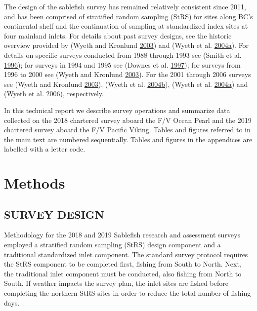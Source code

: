 \documentclass[12pt]{article}\usepackage[]{graphicx}\usepackage[]{color}
\begin{document}
The design of the sablefish survey has remained relatively consistent since 2011, and has been comprised of stratified random sampling (StRS) for sites along BC's continental shelf and the continuation of sampling at standardized index sites at four mainland inlets. For details about past survey designs, see the historic overview provided by (Wyeth and Kronlund \protect\hyperlink{ref-Wyeth2003}{2003}) and (Wyeth et al. \protect\hyperlink{ref-Wyeth2004b}{2004}\protect\hyperlink{ref-Wyeth2004b}{a}). For details on specific surveys conducted from 1988 through 1993 see (Smith et al. \protect\hyperlink{ref-Smith1996}{1996}); for surveys in 1994 and 1995 see (Downes et al. \protect\hyperlink{ref-Downes1997}{1997}); for surveys from 1996 to 2000 see (Wyeth and Kronlund \protect\hyperlink{ref-Wyeth2003}{2003}). For the 2001 through 2006 surveys see (Wyeth and Kronlund \protect\hyperlink{ref-Wyeth2003}{2003}), (Wyeth et al. \protect\hyperlink{ref-Wyeth2004a}{2004}\protect\hyperlink{ref-Wyeth2004a}{b}), (Wyeth et al. \protect\hyperlink{ref-Wyeth2004b}{2004}\protect\hyperlink{ref-Wyeth2004b}{a}) and (Wyeth et al. \protect\hyperlink{ref-Wyeth2006}{2006}), respectively.

In this technical report we describe survey operations and summarize data collected on the 2018 chartered survey aboard the F/V Ocean Pearl and the 2019 chartered survey aboard the F/V Pacific Viking. Tables and figures referred to in the main text are numbered sequentially. Tables and figures in the appendices are labelled with a letter code.

\hypertarget{methods}{%
\section{Methods}\label{methods}}

\hypertarget{survey-design}{%
\subsection{SURVEY DESIGN}\label{survey-design}}

Methodology for the 2018 and 2019 Sablefish research and assessment surveys employed a stratified random sampling (StRS) design component and a traditional standardized inlet component. The standard survey protocol requires the StRS component to be completed first, fishing from South to North. Next, the traditional inlet component must be conducted, also fishing from North to South. If weather impacts the survey plan, the inlet sites are fished before completing the northern StRS sites in order to reduce the total number of fishing days.
\end{document}
